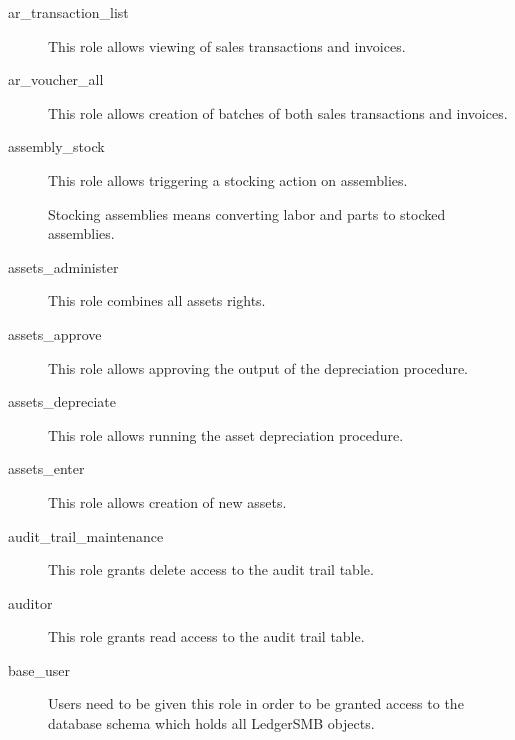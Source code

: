 \begin{description}
\item [ar\_transaction\_list] \htmlspacing 
                         This role allows viewing of sales transactions and invoices.
\item [ar\_voucher\_all] \htmlspacing 
                         This role allows creation of batches of both sales transactions and invoices.
\item [assembly\_stock] \htmlspacing 
                         This role allows triggering a stocking action on assemblies.

                         Stocking assemblies means converting labor and parts to stocked assemblies.
\item [assets\_administer] \htmlspacing 
                         This role combines all assets rights.
\item [assets\_approve] \htmlspacing 
                         This role allows approving the output of the
                         depreciation procedure.
\item [assets\_depreciate] \htmlspacing 
                         This role allows running the asset depreciation
                         procedure.
\item [assets\_enter] \htmlspacing 
                         This role allows creation of new assets.
\item [audit\_trail\_maintenance] \htmlspacing 
                         This role grants delete access to the audit trail table.
\item [auditor] \htmlspacing 
                         This role grants read access to the audit trail table.
\item [base\_user] \htmlspacing 
  Users need to be given this role in order to be granted access to the database schema which holds all LedgerSMB objects.


\end{description}
